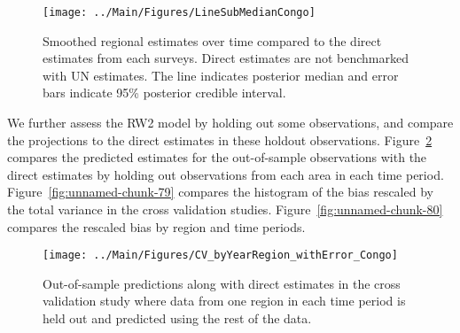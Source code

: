 \documentclass[12pt]{article}\usepackage[]{graphicx}\usepackage[]{color}
\newenvironment{knitrout}{}{} %
\begin{document}
\begin{knitrout}
\color{fgcolor}\begin{figure}[bht]

{\centering \texttt{[image: ../Main/Figures/LineSubMedianCongo]} 

}

\caption[Smoothed regional estimates over time compared to the direct estimates from each surveys]{Smoothed regional estimates over time compared to the direct estimates from each surveys. Direct estimates are not benchmarked with UN estimates. The line indicates posterior median and error bars indicate 95\% posterior credible interval.}\label{fig:unnamed-chunk-77}
\end{figure}


\end{knitrout}
We further assess the RW2 model by holding out some observations, and compare the projections to the direct estimates in these holdout observations. Figure~\ref{fig:unnamed-chunk-78} compares the predicted estimates for the out-of-sample observations  with the direct estimates by holding out observations from each area in each time period.  Figure~\ref{fig:unnamed-chunk-79} compares the histogram of the bias rescaled by the total variance in the cross validation studies. Figure~\ref{fig:unnamed-chunk-80} compares the rescaled bias by region and time periods.



 
\begin{knitrout}
\color{fgcolor}\begin{figure}[bht]

{\centering \texttt{[image: ../Main/Figures/CV\_byYearRegion\_withError\_Congo]} 

}

\caption[Out-of-sample predictions along with direct estimates in the cross validation study where data from one region in each time period is held out and predicted using the rest of the data]{Out-of-sample predictions along with direct estimates in the cross validation study where data from one region in each time period is held out and predicted using the rest of the data.}\label{fig:unnamed-chunk-78}
\end{figure}


\end{knitrout}
\end{document}
